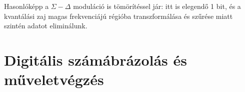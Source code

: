 \documentclass[12pt]{article}
\theoremstyle{plain}
\begin{document}
Hasonlóképp a $\Sigma-\Delta$ moduláció is tömörítéssel jár: itt is elegendő 1 bit, és a kvantálási zaj magas frekvenciájú régióba transzformálása és szűrése miatt szintén adatot eliminálunk.


\section{Digitális számábrázolás és műveletvégzés}



\nocite{Bagoly}
\nocite{BME}
\nocite{hangfeldolgozas}



\end{document}
